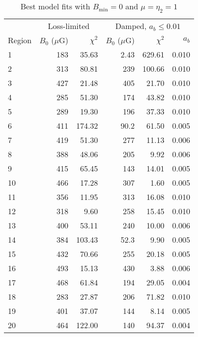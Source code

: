 \documentclass[iop, apj, numberedappendix]{emulateapj}
\newcommand*{\mt}{\mathrm}
\newcommand*{\Bmin}{B_{\mt{min}}}
\begin{document}
\begin{table}
    \scriptsize
    \centering
    \caption{Best model fits with $\Bmin = 0$ and $\mu = \eta_2 = 1$
    \label{tab:fits-all-bminzero}}

    \begin{tabular}{@{} l rr rrr @{}}
    \toprule
    {} & \multicolumn{2}{c}{Loss-limited}
       & \multicolumn{3}{c}{Damped, $a_b \leq 0.01$} \\
    \cmidrule(lr){2-3} \cmidrule(l){4-6}
    Region & $B_0$ ($\mu$G) & $\chi^2$
           & $B_0$ ($\mu$G) & $\chi^2$ & $a_b$ \\
    \midrule
    1 & 183 & 35.63 & 2.43 & 629.61 & 0.010 \\
    2 & 313 & 80.81 & 239 & 100.66 & 0.010 \\
    3 & 427 & 21.48 & 405 & 21.70 & 0.010 \\
    \cmidrule{1-6}
    4 & 285 & 51.30 & 174 & 43.82 & 0.010 \\
    5 & 289 & 19.30 & 196 & 37.33 & 0.010 \\
    6 & 411 & 174.32 & 90.2 & 61.50 & 0.005 \\
    7 & 419 & 51.30 & 277 & 11.13 & 0.006 \\
    8 & 388 & 48.06 & 205 & 9.92 & 0.006 \\
    9 & 415 & 65.45 & 143 & 14.01 & 0.005 \\
    10 & 466 & 17.28 & 307 & 1.60 & 0.005 \\
    \cmidrule{1-6}
    11 & 356 & 11.95 & 313 & 16.08 & 0.010 \\
    12 & 318 & 9.60 & 258 & 15.45 & 0.010 \\
    13 & 400 & 53.11 & 240 & 10.00 & 0.006 \\
    \cmidrule{1-6}
    14 & 384 & 103.43 & 52.3 & 9.90 & 0.005 \\
    15 & 432 & 70.66 & 255 & 20.18 & 0.005 \\
    16 & 493 & 15.13 & 430 & 3.88 & 0.006 \\
    17 & 468 & 61.84 & 194 & 29.05 & 0.004 \\
    \cmidrule{1-6}
    18 & 283 & 27.87 & 206 & 71.82 & 0.010 \\
    19 & 401 & 37.07 & 144 & 8.14 & 0.005 \\
    20 & 464 & 122.00 & 140 & 94.37 & 0.004 \\
    \bottomrule
    \end{tabular}

\end{table}
\end{document}
